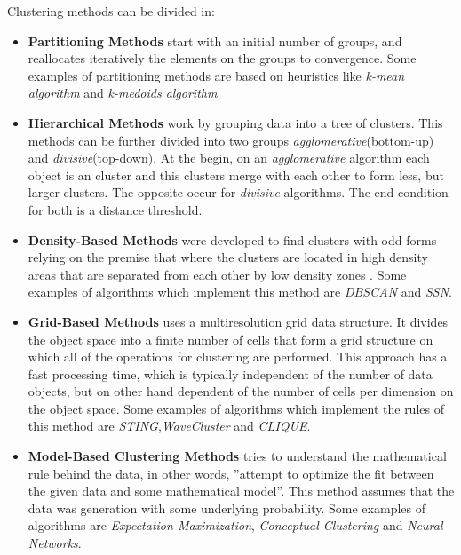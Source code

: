Clustering methods can be divided in\cite{HanKam06}:
\begin{itemize}
\item \textbf{Partitioning Methods} start with an initial number of groups, and reallocates iteratively the elements on the groups
to convergence\cite{DBLP:journals/corr/abs-1205-1117}. Some examples of partitioning methods are based on heuristics like \emph{k-mean algorithm}
and \emph{k-medoids algorithm}

\item \textbf{Hierarchical Methods} work by grouping data into a tree of clusters\cite{HanKam06}. This methods can be further divided into two
groups \emph{agglomerative}(bottom-up) and \emph{divisive}(top-down)\cite{DBLP:journals/corr/abs-1205-1117}. At the begin, on an \emph{agglomerative} algorithm
each object is an cluster and this clusters merge with each other to form less, but larger clusters. The opposite occur for \emph{divisive} algorithms. The end 
condition for both is a distance threshold.\cite{HanKam06}

\item \textbf{Density-Based Methods} were developed to find clusters with odd forms relying on the premise that where the clusters are located in high density areas
that are separated from each other by low density zones \cite{HanKam06}. Some examples of algorithms which implement this method are \emph{DBSCAN} and \emph{SSN}.

\item \textbf{Grid-Based Methods} uses a multiresolution grid data structure. It divides the object space into a finite number of cells that
form a grid structure on which all of the operations for clustering are performed. This approach has a fast processing time,
which is typically independent of the number of data objects, but on other hand dependent of the number of cells per dimension on the object space\cite{HanKam06}.
Some examples of algorithms which implement the rules of this method are \emph{STING},\emph{WaveCluster} and \emph{CLIQUE}.

\item \textbf{Model-Based Clustering Methods} tries to understand the mathematical rule behind the data, in other words,
''attempt to optimize the fit between the given data and some mathematical model''\cite[p. 429]{HanKam06}. This method assumes 
that the data was generation with some underlying probability. Some examples of algorithms are \emph{Expectation-Maximization},
\emph{Conceptual Clustering} and \emph{Neural Networks}.

\end{itemize}

